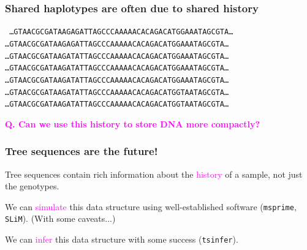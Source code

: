 \documentclass[11pt, mathserif, aspectratio=169]{beamer}
\newcommand{\Cskyblue}[1]{\textcolor{Cskyblue}{#1}}
\newcommand{\Cvermillion}[1]{\textcolor{Cvermillion}{#1}}
\newcommand{\magenta}[1]{\textcolor{magenta}{#1}}
\newenvironment{wideitemize}{\itemize\addtolength{\itemsep}{10pt}}{\enditemize}
\begin{document}
\begin{frame}
\frametitle{Shared haplotypes are often due to shared history}
\begin{center}
{\tt
\ldots GTAACGCGATAAGA\Cvermillion{G}ATTAGCCCAAAAACACAGACATGG\Cvermillion{A}AATAGCGTA\ldots \\
\ldots GTAACGCGATAAGA\Cvermillion{G}ATTAGCCCAAAAACACAGACATGG\Cvermillion{A}AATAGCGTA\ldots \\
\ldots GTAACGCGATAAGA\Cskyblue{T}ATTAGCCCAAAAACACAGACATGG\Cvermillion{A}AATAGCGTA\ldots \\
\ldots GTAACGCGATAAGA\Cskyblue{T}ATTAGCCCAAAAACACAGACATGG\Cvermillion{A}AATAGCGTA\ldots \\
\ldots GTAACGCGATAAGA\Cskyblue{T}ATTAGCCCAAAAACACAGACATGG\Cvermillion{A}AATAGCGTA\ldots \\
\ldots GTAACGCGATAAGA\Cskyblue{T}ATTAGCCCAAAAACACAGACATGG\Cskyblue{T}AATAGCGTA\ldots \\
\ldots GTAACGCGATAAGA\Cskyblue{T}ATTAGCCCAAAAACACAGACATGG\Cskyblue{T}AATAGCGTA\ldots \\
}
\end{center}
\magenta{\bf Q. Can we use this history to store DNA more compactly?}
\end{frame}


\begin{frame}
\frametitle{Tree sequences are the future!}
\begin{wideitemize}
\item Tree sequences contain rich information about the \magenta{history} of a sample, not just the genotypes.
\item We can \magenta{simulate} this data structure using well-established software  (\texttt{msprime}, \texttt{SLiM}). (With some caveats...)
\item We can \magenta{infer} this data structure with some success (\texttt{tsinfer}).
\end{wideitemize}
\end{frame}
\end{document}
